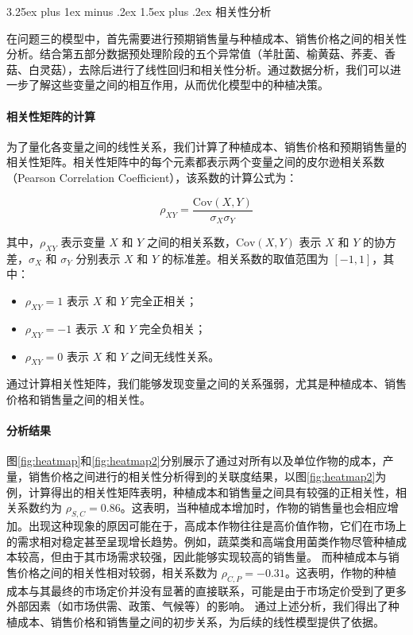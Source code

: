 \documentclass[12pt,a4paper]{nmmcm}
\makeatletter
\renewcommand\subsection{\@startsection{subsection}{2}{0pt}%
    {3.25ex plus 1ex minus .2ex}%
    {1.5ex plus .2ex}%
    {\normalfont\Large\bfseries}}
\makeatother
\begin{document}
\subsection{相关性分析}

在问题三的模型中，首先需要进行预期销售量与种植成本、销售价格之间的相关性分析。结合第五部分数据预处理阶段的五个异常值（羊肚菌、榆黄菇、荞麦、香菇、白灵菇），去除后进行了线性回归和相关性分析。通过数据分析，我们可以进一步了解这些变量之间的相互作用，从而优化模型中的种植决策。

\paragraph{相关性矩阵的计算}

为了量化各变量之间的线性关系，我们计算了种植成本、销售价格和预期销售量的相关性矩阵。相关性矩阵中的每个元素都表示两个变量之间的皮尔逊相关系数（Pearson Correlation Coefficient），该系数的计算公式为：

\[
  \rho_{XY} = \frac{\mathrm{Cov}(X, Y)}{\sigma_X \sigma_Y}
\]

其中，$\rho_{XY}$ 表示变量 $X$ 和 $Y$ 之间的相关系数，$\mathrm{Cov}(X, Y)$ 表示 $X$ 和 $Y$ 的协方差，$\sigma_X$ 和 $\sigma_Y$ 分别表示 $X$ 和 $Y$ 的标准差。相关系数的取值范围为 $[-1, 1]$，其中：
\begin{itemize}
  \item $\rho_{XY} = 1$ 表示 $X$ 和 $Y$ 完全正相关；
  \item $\rho_{XY} = -1$ 表示 $X$ 和 $Y$ 完全负相关；
  \item $\rho_{XY} = 0$ 表示 $X$ 和 $Y$ 之间无线性关系。
\end{itemize}

通过计算相关性矩阵，我们能够发现变量之间的关系强弱，尤其是种植成本、销售价格和销售量之间的相关性。

\paragraph{分析结果}

图\ref{fig:heatmap}和\ref{fig:heatmap2}分别展示了通过对所有以及单位作物的成本，产量，销售价格之间进行的相关性分析得到的关联度结果，以图\ref{fig:heatmap2}为例，计算得出的相关性矩阵表明，种植成本和销售量之间具有较强的正相关性，相关系数约为 $\rho_{S,C} = 0.86$。这表明，当种植成本增加时，作物的销售量也会相应增加。出现这种现象的原因可能在于，高成本作物往往是高价值作物，它们在市场上的需求相对稳定甚至呈现增长趋势。例如，蔬菜类和高端食用菌类作物尽管种植成本较高，但由于其市场需求较强，因此能够实现较高的销售量。
而种植成本与销售价格之间的相关性相对较弱，相关系数为 $\rho_{C,P} = -0.31$。这表明，作物的种植成本与其最终的市场定价并没有显著的直接联系，可能是由于市场定价受到了更多外部因素（如市场供需、政策、气候等）的影响。
通过上述分析，我们得出了种植成本、销售价格和销售量之间的初步关系，为后续的线性模型提供了依据。
\end{document}
